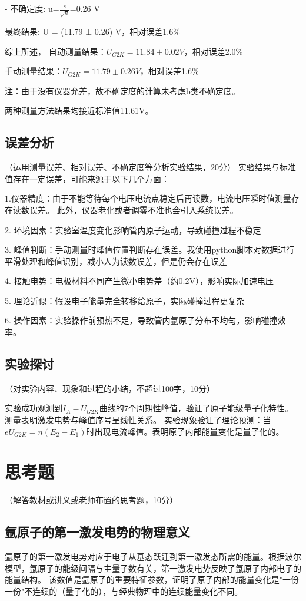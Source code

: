 \documentclass[10pt,a4paper]{ctexart}
\newcommand{\myspace}[1]{\par\vspace{#1\baselineskip}} %
\newcommand{\xiaosi}{\fontsize{12pt}{16pt}\selectfont}
\begin{document}
- 不确定度: u=$\frac{s}{\sqrt{n}}$=0.26 V

最终结果: U = (11.79 ± 0.26) V，相对误差1.6\%


    综上所述，
    自动测量结果：$U_{G2K} = 11.84 \pm 0.02V$，相对误差2.0\%
    
    手动测量结果：$U_{G2K} = 11.79 \pm 0.26V$，相对误差1.6\%
    
    注：由于没有仪器允差，故不确定度的计算未考虑b类不确定度。
    
    两种测量方法结果均接近标准值11.61V。
    
    \myspace{2}
\subsection{误差分析}
    \xiaosi （运用测量误差、相对误差、不确定度等分析实验结果，20分）
实验结果与标准值存在一定误差，可能来源于以下几个方面：

    1.仪器精度：由于不能等待每个电压电流点稳定后再读数，电流电压瞬时值测量存在读数误差。
    此外，仪器老化或者调零不准也会引入系统误差。

2. 环境因素：实验室温度变化影响管内原子运动，导致碰撞过程不稳定

3. 峰值判断：手动测量时峰值位置判断存在误差。我使用python脚本对数据进行平滑处理和峰值识别，减小人为读数误差，但是仍会存在误差

4. 接触电势：电极材料不同产生微小电势差（约0.2V），影响实际加速电压

5. 理论近似：假设电子能量完全转移给原子，实际碰撞过程更复杂

6. 操作因素：实验操作前预热不足，导致管内氩原子分布不均匀，影响碰撞效率。
    \subsection{实验探讨}
    \xiaosi （对实验内容、现象和过程的小结，不超过100字，10分）

实验成功观测到$I_A-U_{G2K}$曲线的7个周期性峰值，验证了原子能级量子化特性。
测量表明激发电势与峰值序号呈线性关系。
实验现象验证了理论预测：当$eU_{G2K}=n(E_2-E_1)$时出现电流峰值。表明原子内部能量变化是量子化的。
\section{思考题}

    \xiaosi （解答教材或讲义或老师布置的思考题，10分）

    \subsection{氩原子的第一激发电势的物理意义}
   氩原子的第一激发电势对应于电子从基态跃迁到第一激发态所需的能量。根据波尔模型，氩原子的能级间隔与主量子数有关，第一激发电势反映了氩原子内部电子的能量结构。
该数值是氩原子的重要特征参数，证明了原子内部的能量变化是"一份一份"不连续的（量子化的），与经典物理中的连续能量变化不同。
\end{document}
